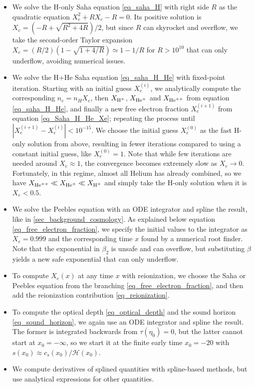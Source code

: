 \documentclass[10pt,a4paper]{article}
\begin{document}
\begin{itemize}
\item
We solve the H-only Saha equation \eqref{eq_saha_H}
with right side $R$
as the quadratic equation $X_e^2 + R X_e - R = 0$.
Its positive solution is $X_e = (-R + \sqrt{R^2+4R})/2$,
but since $R$ can skyrocket and overflow,
we take the second-order Taylor expansion $X_e = (R/2) (1 - \sqrt{1 + 4/R}) \simeq 1 - 1/R$
for $R > 10^{10}$ that can only underflow, avoiding numerical issues.

\item
We solve the H+He Saha equation \eqref{eq_saha_H_He} with fixed-point iteration.
Starting with an initial guess $X_e^{(i)}$,
we analytically compute the corresponding $n_e = n_H X_e$,
then $X_{\text{H}^+}$, $X_{\text{He}^+}$ and $X_{\text{He}^{++}}$ from equation \eqref{eq_saha_H_He},
and finally a new free electron fraction $X_e^{(i+1)}$ from equation \eqref{eq_Saha_H_He_Xe};
repeating the process until $|X_e^{(i+1)}-X_e^{(i)}| < 10^{-15}$.
We choose the initial guess $X_e^{(0)}$ as the fast H-only solution from above,
resulting in fewer iterations compared to using a constant initial guess, like $X_e^{(0)} = 1$.
Note that while few iterations are needed around $X_e \approx 1$,
the convergence becomes extremely slow as $X_e \rightarrow 0$.
Fortunately, in this regime, almost all Helium has already combined,
so we have $X_{\text{He}^{++}} \ll X_{\text{He}^+} \ll X_{\text{H}^+}$ and simply take the H-only solution when it is $X_e < 0.5$.

\item
We solve the Peebles equation with an ODE integrator and spline the result, like in \cref{sec_background_cosmology}.
As explained below equation \eqref{eq_free_electron_fraction},
we specify the initial values to the integrator
as $X_e = 0.999$ and the corresponding time $x$ found by a numerical root finder.
Note that the exponential in $\beta_2$ is unsafe and can overflow,
but substituting $\beta$ yields a new safe exponential that can only underflow.

\item
To compute $X_e(x)$ at any time $x$ with reionization,
we choose the Saha or Peebles equation from the branching \eqref{eq_free_electron_fraction},
and then add the reionization contribution \eqref{eq_reionization}.

\item
To compute the optical depth \eqref{eq_optical_depth} and the sound horizon \eqref{eq_sound_horizon},
we again use an ODE integrator and spline the result.
The former is integrated backwards from $\tau(\eta_0)=0$,
but the latter cannot start at $x_0 = -\infty$,
so we start it at the finite early time $x_0 = -20$ with $s(x_0) \approx c_s(x_0) / \mathcal{H}(x_0)$.

\item
We compute derivatives of splined quantities with spline-based methods,
but use analytical expressions for other quantities.
\end{itemize}
\end{document}
